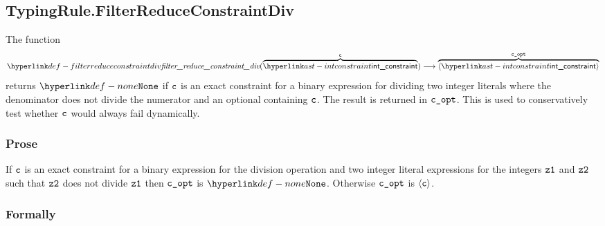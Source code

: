 \begin{mathpar}
\end{mathpar}

\subsection{TypingRule.FilterReduceConstraintDiv \label{sec:TypingRule.FilterReduceConstraintDiv}}
\hypertarget{def-filterreduceconstraintdiv}{}
The function
\[
\filterreduceconstraintdiv(\overname{\intconstraint}{\vc}) \aslto \overname{\langle\intconstraint\rangle}{\vcopt}
\]
returns $\None$ if $\vc$ is an exact constraint for a binary expression for dividing two integer literals
where the denominator does not divide the numerator and an optional containing $\vc$.
The result is returned in $\vcopt$.
This is used to conservatively test whether $\vc$ would always fail dynamically.

\subsubsection{Prose}
If $\vc$ is an exact constraint for a binary expression for the division operation and two integer literal
expressions for the integers $\vzone$ and $\vztwo$ such that $\vztwo$ does not divide $\vzone$ then
$\vcopt$ is $\None$. Otherwise $\vcopt$ is $\langle\vc\rangle$.

\subsubsection{Formally}
\begin{mathpar}
\end{mathpar}

\begin{mathpar}
\end{mathpar}

